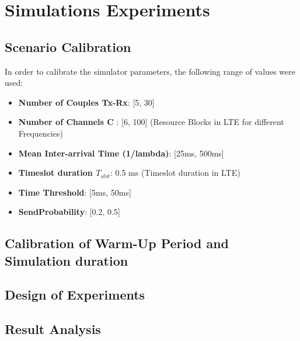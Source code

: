 \section{Simulations Experiments}
\subsection{Scenario Calibration}
In order to calibrate the simulator parameters, the following range of values were used:
\begin{itemize}
	\item \textbf{Number of Couples Tx-Rx}: [5, 30]
	\item \textbf{Number of Channels C} : [6, 100] (Resource Blocks in LTE for different Frequencies)
	\item \textbf{Mean Inter-arrival Time (1/lambda)}: [25ms, 500ms]   
	\item \textbf{Timeslot duration $T_{slot}$}: 0.5 ms (Timeslot duration in LTE)
	\item \textbf{Time Threshold}: [5ms, 50ms] 
	\item \textbf{SendProbability}: [0.2, 0.5] 
\end{itemize}

\subsection{Calibration of Warm-Up Period and Simulation duration}

\subsection{Design of Experiments}
\subsection{Result Analysis}